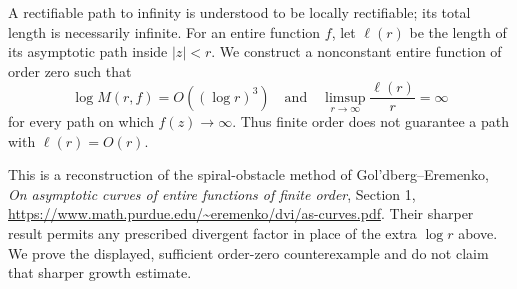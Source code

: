 A rectifiable path to infinity is understood to be locally rectifiable; its total length is necessarily infinite. For an entire function $f$, let $\ell(r)$ be the length of its asymptotic path inside $|z|<r$. We construct a nonconstant entire function of order zero such that
\[
 \log M(r,f)=O((\log r)^3)
 \quad\text{and}\quad
 \limsup_{r\to\infty}\frac{\ell(r)}r=\infty
\]
for every path on which $f(z)\to\infty$. Thus finite order does not guarantee a path with $\ell(r)=O(r)$.

This is a reconstruction of the spiral-obstacle method of Gol'dberg--Eremenko, \emph{On asymptotic curves of entire functions of finite order}, Section 1, \url{https://www.math.purdue.edu/~eremenko/dvi/as-curves.pdf}. Their sharper result permits any prescribed divergent factor in place of the extra $\log r$ above. We prove the displayed, sufficient order-zero counterexample and do not claim that sharper growth estimate.
